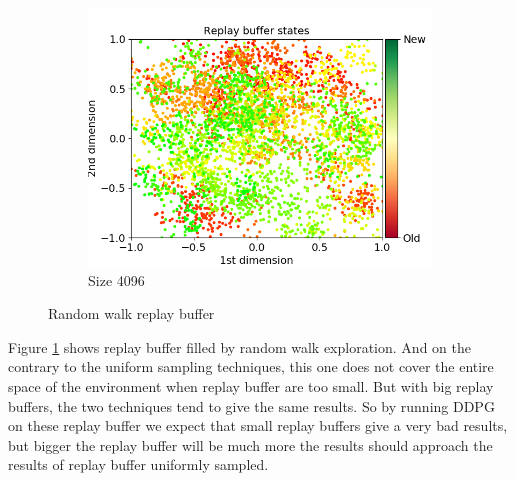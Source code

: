 \documentclass{article}
\begin{document}
\begin{figure}[H]
\begin{subfigure}[b]{0.3\linewidth}
    \includegraphics[width=\linewidth]{Study_1/buffer/sequential_4096.png}
    \caption{Size 4096}
  \end{subfigure}
  \caption{Random walk replay buffer}
  \label{fig:buffers_random_walk}
\end{figure}

Figure \ref{fig:buffers_random_walk} shows replay buffer filled by random walk exploration. And on the contrary to the uniform sampling techniques, this one does not cover the entire space of the environment when replay buffer are too small. But with big replay buffers, the two techniques tend to give the same results. So by running DDPG on these replay buffer we expect that small replay buffers give a very bad results, but bigger the replay buffer will be much more the results should approach the results of replay buffer uniformly sampled.
\end{document}
